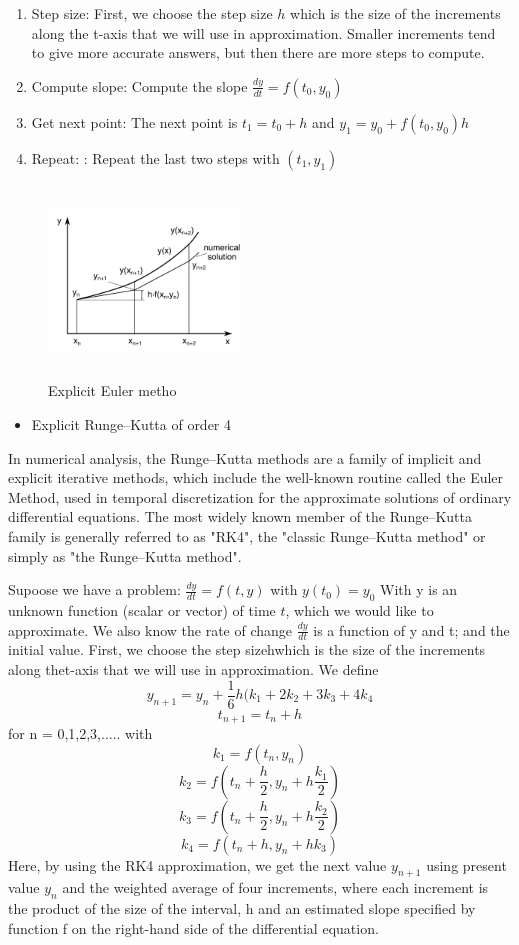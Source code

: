 \begin{enumerate}
    \item Step size:  First, we choose the step size $h$ which is the size of the increments along the t-axis that we will use in approximation. Smaller increments tend to give more accurate answers, but then there are more steps to compute. 
    \item Compute slope: Compute the slope $\frac{dy}{dt} = f(t_0,y_0)$
    \item Get next point: The next point is $t_1 = t_0 + h$ and $y_1 = y_0 + f(t_0,y_0)h$
    \item Repeat: : Repeat the last two steps with $(t_1,y_1)$
\end{enumerate}
\begin{figure}[h]
    \centering
    \includegraphics[width = 2in, height = 2in]{Code/Pic/Euler.png}
    \caption{Explicit Euler metho}
    \label{fig:my_label}
\end{figure}
\begin{itemize}
    \item Explicit Runge–Kutta of order 4
\end{itemize}
In numerical analysis, the Runge–Kutta methods are a family of implicit and explicit iterative methods, which include the well-known routine called the Euler Method, used in temporal discretization for the approximate solutions of ordinary differential equations. The most widely known member of the Runge–Kutta family is generally referred to as "RK4", the "classic Runge–Kutta method" or simply as "the Runge–Kutta method".

Supoose we have a problem: $\frac{dy}{dt}=f(t,y)$ with $y(t_0)=y_0$
With y is an unknown function (scalar or vector) of time $t$,  which we would like to approximate. We also know the rate of change $\frac{dy}{dt}$ is a function of y and t; and the initial value.
 First,  we choose the step sizehwhich is the size of the increments along thet-axis that we will use in approximation. We define
 \[y_{n+1}=y_n+\frac{1}{6}h(k_1+2k_2+3k_3+4k_4\]
 \[t_{n+1}=t_n+h\]
 for n = 0,1,2,3,..... with
 \[k_1=f(t_n,y_n)\]
 \[k_2=f(t_n+\frac{h}{2},y_n+h\frac{k_1}{2})\]
 \[k_3=f(t_n+\frac{h}{2},y_n+h\frac{k_2}{2})\]
 \[k_4=f(t_n+h,y_n+h k_3)\]
 Here, by using the RK4 approximation, we get the next value $y_{n+1}$ using present value $y_n$ and the weighted average of four increments, where each increment is the product of the size of the interval, h  and an estimated slope specified by function f on the right-hand side of the differential equation.
 
